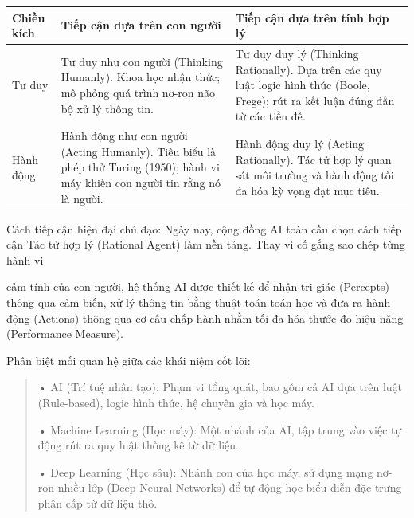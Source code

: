 \label{tab:legacy-1.1}

{\def\LTcaptype{none} %
\begin{longtable}[]{@{}
  >{\raggedright\arraybackslash}p{}
  >{\raggedright\arraybackslash}p{}
  >{\raggedright\arraybackslash}p{}@{}}
\toprule\noalign{}
\begin{minipage}[b]{\linewidth}\raggedright
\textbf{Chiều kích}
\end{minipage} & \begin{minipage}[b]{\linewidth}\raggedright
\textbf{Tiếp cận dựa trên con người}
\end{minipage} & \begin{minipage}[b]{\linewidth}\raggedright
\textbf{Tiếp cận dựa trên tính hợp lý}
\end{minipage} \\
\midrule\noalign{}
\endhead
\bottomrule\noalign{}
\endlastfoot
Tư duy & Tư duy như con người (Thinking Humanly). Khoa học nhận thức; mô
phỏng quá trình nơ-ron não bộ xử lý thông tin. & Tư duy duy lý (Thinking
Rationally). Dựa trên các quy luật logic hình thức (Boole, Frege); rút
ra kết luận đúng đắn từ các tiền đề. \\
Hành động & Hành động như con người (Acting Humanly). Tiêu biểu là phép
thử Turing (1950); hành vi máy khiến con người tin rằng nó là người. &
Hành động duy lý (Acting Rationally). Tác tử hợp lý quan sát môi trường
và hành động tối đa hóa kỳ vọng đạt mục tiêu. \\
\end{longtable}
}

Cách tiếp cận hiện đại chủ đạo: Ngày nay, cộng đồng AI toàn cầu chọn
cách tiếp cận Tác tử hợp lý (Rational Agent) làm nền tảng. Thay vì cố
gắng sao chép từng hành vi

cảm tính của con người, hệ thống AI được thiết kế để nhận tri giác
(Percepts) thông qua cảm biến, xử lý thông tin bằng thuật toán toán học
và đưa ra hành động (Actions) thông qua cơ cấu chấp hành nhằm tối đa hóa
thước đo hiệu năng (Performance Measure).

Phân biệt mối quan hệ giữa các khái niệm cốt lõi:

\begin{quote}
• AI (Trí tuệ nhân tạo): Phạm vi tổng quát, bao gồm cả AI dựa trên luật
(Rule-based), logic hình thức, hệ chuyên gia và học máy.

• Machine Learning (Học máy): Một nhánh của AI, tập trung vào
việc tự động rút ra quy luật thống kê từ dữ liệu.

• Deep Learning (Học sâu): Nhánh con của học máy, sử dụng mạng nơ-ron
nhiều lớp (Deep Neural Networks) để tự động học biểu diễn đặc trưng phân
cấp từ dữ liệu thô.
\end{quote}

